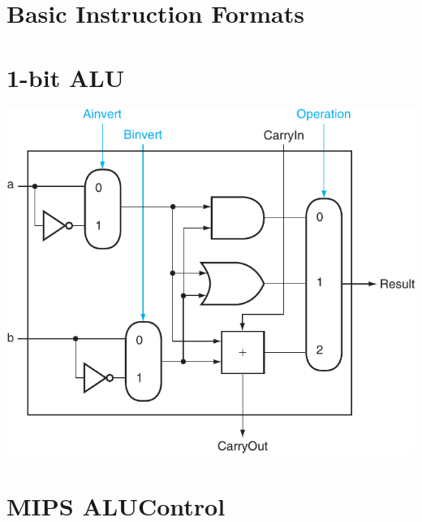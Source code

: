 \documentclass[11pt]{article}
\begin{document}
\begin{minipage}[t]{0.35\linewidth}
	\section*{Basic Instruction Formats}
	\vspace{1ex}
	

	\vspace{1em}
	\vspace{1ex}

	\section*{1-bit ALU}

	\includegraphics[width=\linewidth]{mips-cpu/alu.pdf}

	\vspace{1ex}
	\vspace{0.5mm}
	
\end{minipage}



\vfill

\begin{minipage}[t]{\linewidth}
	\begin{minipage}[t]{0.5\textwidth}
		\section*{MIPS ALUControl}
		
	\end{minipage}
	\begin{minipage}[t]{0.28\textwidth}
	\end{minipage}
\end{minipage}
\end{document}
